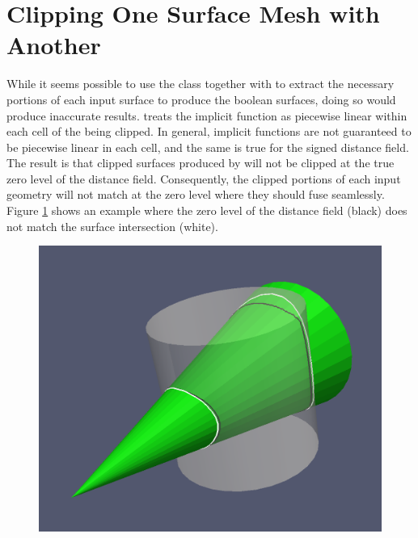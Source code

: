 \documentclass{InsightArticle}
\begin{document}
\section{Clipping One Surface Mesh with Another}

While it seems possible to use the class  together with  to extract the necessary portions of each input surface to produce the boolean surfaces, doing so would produce inaccurate results.  treats the implicit function as piecewise linear within each cell of the  being clipped. In general, implicit functions are not guaranteed to be piecewise linear in each cell, and the same is true for the signed distance field. The result is that clipped surfaces produced by  will not be clipped at the true zero level of the distance field. Consequently, the clipped portions of each input geometry will not match at the zero level where they should fuse seamlessly. Figure \ref{fig:DistanceZeroLevelVsIntersection} shows an example where the zero level of the distance field (black) does not match the surface intersection (white). 

\begin{figure}[t]
\centering
\includegraphics[scale=0.25]{Figures/DistanceZeroLevelVsIntersection}
\label{fig:DistanceZeroLevelVsIntersection}
\end{figure}
\end{document}
